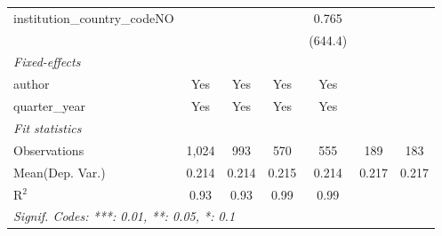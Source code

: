 \begin{tabular}{lcccccc}
   institution\_country\_codeNO          &              &              &                & 0.765          &     &   \\   
                                         &              &              &                & (644.4)        &     &   \\   
   \midrule
   \emph{Fixed-effects}\\
   author                                & Yes          & Yes          & Yes            & Yes            &     & \\  
   quarter\_year                         & Yes          & Yes          & Yes            & Yes            &     & \\  
   \midrule
   \emph{Fit statistics}\\
   Observations                          & 1,024        & 993          & 570            & 555            & 189 & 183\\  
Mean(Dep. Var.) & 0.214 & 0.214 & 0.215 & 0.214 & 0.217 & 0.217 \\
   R$^2$                                 & 0.93         & 0.93         & 0.99           & 0.99           &     & \\  
   \midrule \midrule
   \multicolumn{7}{l}{\emph{Signif. Codes: ***: 0.01, **: 0.05, *: 0.1}}\\
\end{tabular}
\par\endgroup
